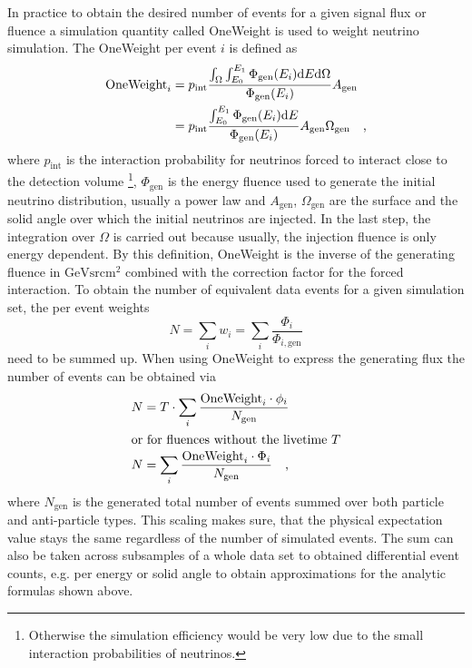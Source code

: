 In practice to obtain the desired number of events for a given signal flux or fluence a simulation quantity called OneWeight is used to weight neutrino simulation.
The OneWeight per event $i$ is defined as 
\begin{align}
  \text{OneWeight}_i
  &= p_\text{int}\frac{\int_\Omega\int_{E_0}^{E_1}
                       \Phi_\text{gen}(E_i)\mathrm{d}E\mathrm{d}\Omega
                       }{\Phi_\text{gen}(E_i)}A_\text{gen} \\
  &= p_\text{int}\frac{\int_{E_0}^{E_1}\Phi_\text{gen}(E_i)\mathrm{d}E}
                      {\Phi_\text{gen}(E_i)}
    A_\text{gen}\Omega_\text{gen}
  \quad\text{,}
\end{align}
where $p_\text{int}$ is the interaction probability for neutrinos forced to interact close to the detection volume \footnote{Otherwise the simulation efficiency would be very low due to the small interaction probabilities of neutrinos.}, $\Phi_\text{gen}$ is the energy fluence used to generate the initial neutrino distribution, usually a power law and $A_\text{gen}$, $\Omega_\text{gen}$ are the surface and the solid angle over which the initial neutrinos are injected.
In the last step, the integration over $\Omega$ is carried out because usually, the injection fluence is only energy dependent.
By this definition, OneWeight is the inverse of the generating fluence in $\si{\GeV\steradian\cm\squared}$ combined with the correction factor for the forced interaction.
To obtain the number of equivalent data events for a given simulation set, the per event weights
\begin{equation}
  N = \sum_i w_i = \sum_i \frac{\Phi_i}{\Phi_{i,\text{gen}}}
\end{equation}
need to be summed up.
When using OneWeight to express the generating flux the number of events can be obtained via
\begin{align}
  N &= T \cdot \sum_i \frac{\text{OneWeight}_i \cdot \phi_i}{N_\text{gen}} \\
  \intertext{or for fluences without the livetime $T$}
  N &= \sum_i \frac{\text{OneWeight}_i \cdot \Phi_i}{N_\text{gen}}
  \quad\text{,}
\end{align}
where $N_\text{gen}$ is the generated total number of events summed over both particle and anti-particle types.
This scaling makes sure, that the physical expectation value stays the same regardless of the number of simulated events.
The sum can also be taken across subsamples of a whole data set to obtained differential event counts, e.g. per energy or solid angle to obtain approximations for the analytic formulas shown above.

